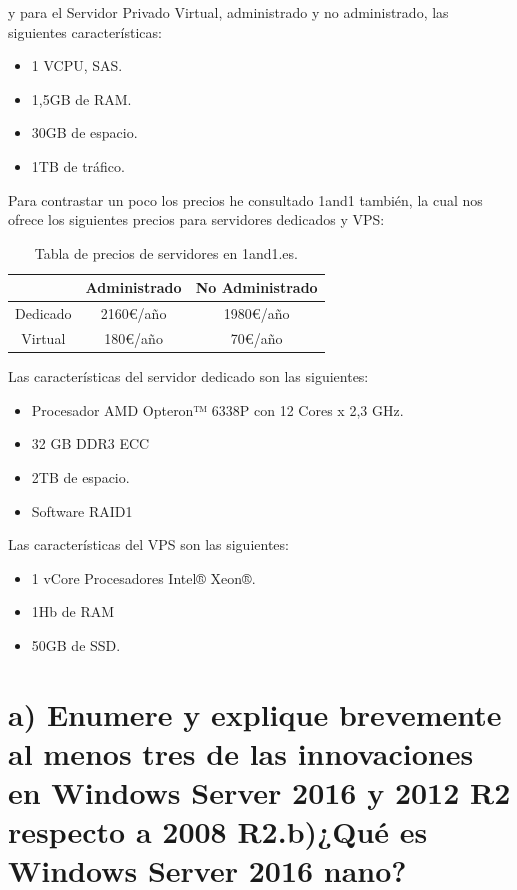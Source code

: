  y para el Servidor Privado Virtual, administrado y no administrado, las siguientes características:
 \begin{itemize}
 	\item 1 VCPU, SAS.
 	\item 1,5GB de RAM.
 	\item 30GB de espacio.
 	\item 1TB de tráfico.
 \end{itemize} 


Para contrastar un poco los precios he consultado 1and1 \cite{1and1} también, la cual nos ofrece los siguientes precios para servidores dedicados y VPS:
\begin{table}[H]
	\centering
	\begin{tabular}{|c|c|c|}
		\hline
		\textbf{ } & \textbf{Administrado} & \textbf{No Administrado} \\
		\hline
		Dedicado & 2160€/año & 1980€/año \\
		Virtual & 180€/año & 70€/año \\
		\hline
	\end{tabular}  
	\caption{Tabla de precios de servidores en 1and1.es.} \label{tab:tablasencilla}
\end{table}

Las características del servidor dedicado son las siguientes: 
\begin{itemize}
	\item Procesador AMD Opteron™ 6338P con 12 Cores x 2,3 GHz.
	\item 32 GB DDR3 ECC
	\item 2TB de espacio.
	\item Software RAID1
\end{itemize}

Las características del VPS son las siguientes:
\begin{itemize}
	\item 1 vCore Procesadores Intel® Xeon®.
	\item 1Hb de RAM
	\item 50GB de SSD.
\end{itemize}


\section{a) Enumere y explique brevemente al menos tres de las innovaciones en Windows Server 2016 y 2012 R2 respecto a 2008 R2.\newline b)¿Qué es Windows Server 2016 nano? }

